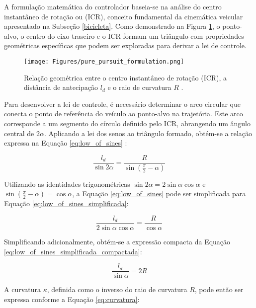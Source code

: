 A formulação matemática do controlador baseia-se na análise do centro instantâneo de rotação ou (ICR), conceito fundamental da cinemática veicular apresentado na Subseção \ref{bicicleta}. Como demonstrado na Figura \ref{pure_pursuit_formulation}, o ponto-alvo, o centro do eixo traseiro e o ICR formam um triângulo com propriedades geométricas específicas que podem ser exploradas para derivar a lei de controle.

\begin{figure}[H]
\centering
\texttt{[image: Figures/pure\_pursuit\_formulation.png]}
\caption{Relação geométrica entre o centro instantâneo de rotação (ICR), a distância de antecipação $l_d$ e o raio de curvatura $R$ \cite[Week 6 - Lesson 2: Geometric Lateral Control - Pure Pursuit. ~3min52s]{University_of_Toronto2018-fe}.}
\label{pure_pursuit_formulation}
\end{figure}

Para desenvolver a lei de controle, é necessário determinar o arco circular que conecta o ponto de referência do veículo ao ponto-alvo na trajetória. Este arco corresponde a um segmento do círculo definido pelo ICR, abrangendo um ângulo central de $2\alpha$. Aplicando a lei dos senos ao triângulo formado, obtém-se a relação expressa na Equação \ref{eq:low_of_sines} \cite[p.~9]{snider2009automatic}:

\begin{equation}\label{eq:low_of_sines}
\frac{l_d}{\sin 2\alpha} = \frac{R}{\sin \left(\frac{\pi}{2} - \alpha \right)}
\end{equation}

Utilizando as identidades trigonométricas $\sin 2\alpha = 2\sin\alpha\cos\alpha$ e $\sin(\frac{\pi}{2} - \alpha) = \cos\alpha$, a Equação \ref{eq:low_of_sines} pode ser simplificada para Equação \ref{eq:low_of_sines_simplificada}:

\begin{equation}\label{eq:low_of_sines_simplificada}
\frac{l_d}{2 \sin \alpha \cos \alpha} = \frac{R}{\cos\alpha}
\end{equation}

Simplificando adicionalmente, obtém-se a expressão compacta da Equação \ref{eq:low_of_sines_simplificada_compactada}:

\begin{equation}\label{eq:low_of_sines_simplificada_compactada}
\frac{l_d}{\sin \alpha} = 2R
\end{equation}

A curvatura $\kappa$, definida como o inverso do raio de curvatura $R$, pode então ser expressa conforme a Equação \ref{eq:curvatura}:

